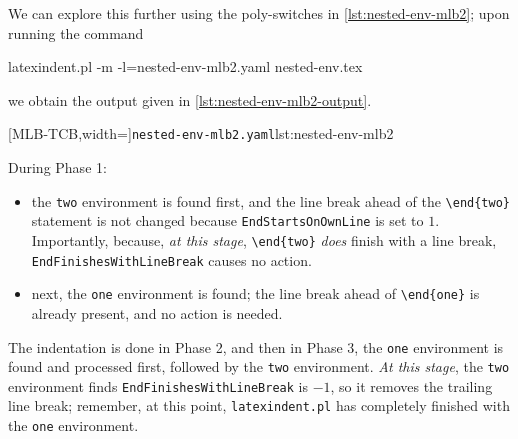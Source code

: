  \begin{example}
 We can explore this further using the poly-switches in \cref{lst:nested-env-mlb2}; upon
 running the command  

 \begin{commandshell}
latexindent.pl -m -l=nested-env-mlb2.yaml nested-env.tex
\end{commandshell}

 we obtain the output given in \cref{lst:nested-env-mlb2-output}.

 \begin{cmhtcbraster}
  [MLB-TCB,width=\linewidth]{\texttt{nested-env-mlb2.yaml}}{lst:nested-env-mlb2}
 \end{cmhtcbraster}

 During Phase 1:
 \begin{itemize}
  \item the \texttt{two} environment is found first, and the line break ahead of the
        \lstinline!\end{two}! statement is not changed because
        \texttt{EndStartsOnOwnLine} is set to $1$. Importantly, because, \emph{at this
        stage}, \lstinline!\end{two}! \emph{does} finish with a line break,
        \texttt{EndFinishesWithLineBreak} causes no action.
  \item next, the \texttt{one} environment is found; the line break ahead of
        \lstinline!\end{one}! is already present, and no action is needed.
 \end{itemize}
 The indentation is done in Phase 2, and then in Phase 3, the \texttt{one} environment is
 found and processed first, followed by the \texttt{two} environment. \emph{At this
 stage}, the \texttt{two} environment finds \texttt{EndFinishesWithLineBreak} is $-1$, so
 it removes the trailing line break; remember, at this point, \texttt{latexindent.pl} has
 completely finished with the \texttt{one} environment.
 \end{example}
